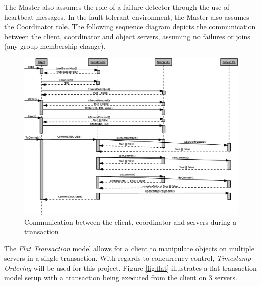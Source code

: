 \documentclass[times, 10pt,twocolumn]{article}
\begin{document}
The Master also assumes the role of a failure detector through the use of heartbeat messages. In the fault-tolerant environment, the Master also assumes the Coordinator role.
\label{sec:algor}
The following sequence diagram depicts the communication between the client, coordinator and object servers,
assuming no failures or joins (any group membership change). 

\begin{figure}
\centering
\includegraphics[scale=0.25]{seqDiaCommSteps.eps}
\caption{Communication between the client, coordinator and servers during a transaction}
\label{fig:seqd}
\end{figure}

\label{subsec:transmgt}
The {\it Flat Transaction} model allows for a client to manipulate objects on multiple servers in a single transaction. With regards to concurrency control, {\it Timestamp Ordering} will be used for this project. Figure \ref{fig:flat} illustrates a flat transaction model setup with a transaction being executed from the client on 3 servers.
\end{document}
